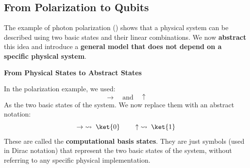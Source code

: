 \subsection{From Polarization to Qubits}

The example of photon polarization () shows that a physical system can be described using two basic states and their linear combinations. We now \textbf{abstract} this idea and introduce a \textbf{general model that does not depend on a specific physical system}.

\highspace
\begin{flushleft}
    \textcolor{Green3}{ \textbf{From Physical States to Abstract States}}
\end{flushleft}
In the polarization example, we used:
\begin{equation*}
    \rightarrow \quad \text{and} \quad \uparrow
\end{equation*}
As the two basic states of the system. We now replace them with an abstract notation:
\begin{equation*}
    \rightarrow \;\rightsquigarrow\; \ket{0}
    \hspace{2em}
    \uparrow \;\rightsquigarrow\; \ket{1}
\end{equation*}
These are called the \textbf{computational basis states}. They are just symbols (used in Dirac notation) that represent the two basic states of the system, without referring to any specific physical implementation.


